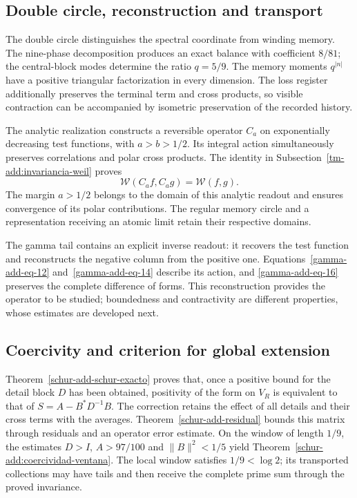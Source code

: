 \subsection*{Double circle, reconstruction and transport}

The double circle distinguishes the spectral coordinate
from winding memory. The nine-phase decomposition produces
an exact balance with coefficient $8/81$; the central-block
modes determine the ratio $q=5/9$. The memory moments
$q^{|n|}$ have a positive triangular factorization in every
dimension. The loss register additionally preserves the
terminal term and cross products, so visible contraction
can be accompanied by isometric preservation of the
recorded history.

The analytic realization constructs a reversible operator
$C_a$ on exponentially decreasing test functions, with
$a>b>1/2$. Its integral action simultaneously preserves
correlations and polar cross products. The identity in
Subsection~\ref{tm-add:invariancia-weil} proves
\[
\mathscr W(C_af,C_ag)=\mathscr W(f,g).
\]
The margin $a>1/2$ belongs to the domain of this analytic
readout and ensures convergence of its polar contributions.
The regular memory circle and a representation receiving
an atomic limit retain their respective domains.

The gamma tail contains an explicit inverse readout:
it recovers the test function and reconstructs the negative
column from the positive one.
Equations~\eqref{gamma-add-eq-12}
and~\eqref{gamma-add-eq-14} describe its action, and
\eqref{gamma-add-eq-16} preserves the complete difference
of forms. This reconstruction provides the operator to be
studied; boundedness and contractivity are different
properties, whose estimates are developed next.

\subsection*{Coercivity and criterion for global extension}

Theorem~\ref{schur-add-schur-exacto} proves that, once
a positive bound for the detail block $D$ has been obtained,
positivity of the form on $V_R$ is equivalent to that of
$S=A-B^*D^{-1}B$. The correction retains the effect of
all details and their cross terms with the averages.
Theorem~\ref{schur-add-residual} bounds this matrix through
residuals and an operator error estimate. On the window
of length $1/9$, the estimates
$D>I$, $A>97/100$ and $\|B\|^2<1/5$ yield
Theorem~\ref{schur-add:coercividad-ventana}. The local
window satisfies $1/9<\log2$; its transported collections
may have tails and then receive the complete prime sum
through the proved invariance.

